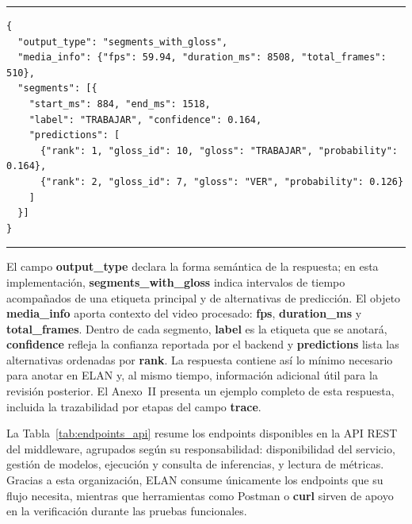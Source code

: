 \begin{center}
\begin{minipage}{0.92\textwidth}
\hrule
\vspace{0.12cm}
\footnotesize
\begin{Verbatim}[baselinestretch=0.76]
{
  "output_type": "segments_with_gloss",
  "media_info": {"fps": 59.94, "duration_ms": 8508, "total_frames": 510},
  "segments": [{
    "start_ms": 884, "end_ms": 1518,
    "label": "TRABAJAR", "confidence": 0.164,
    "predictions": [
      {"rank": 1, "gloss_id": 10, "gloss": "TRABAJAR", "probability": 0.164},
      {"rank": 2, "gloss_id": 7, "gloss": "VER", "probability": 0.126}
    ]
  }]
}
\end{Verbatim}
\vspace{0.05cm}
\hrule

\label{lst:respuesta_backend_middleware}
\end{minipage}
\end{center}

El campo \textbf{output\_type} declara la forma semántica de la respuesta; en esta implementación, \textbf{segments\_with\_gloss} indica intervalos de tiempo acompañados de una etiqueta principal y de alternativas de predicción. El objeto \textbf{media\_info} aporta contexto del video procesado: \textbf{fps}, \textbf{duration\_ms} y \textbf{total\_frames}. Dentro de cada segmento, \textbf{label} es la etiqueta que se anotará, \textbf{confidence} refleja la confianza reportada por el backend y \textbf{predictions} lista las alternativas ordenadas por \textbf{rank}. La respuesta contiene así lo mínimo necesario para anotar en ELAN y, al mismo tiempo, información adicional útil para la revisión posterior. El Anexo~II presenta un ejemplo completo de esta respuesta, incluida la trazabilidad por etapas del campo \textbf{trace}.

La Tabla~\ref{tab:endpoints_api} resume los endpoints disponibles en la API REST del middleware, agrupados según su responsabilidad: disponibilidad del servicio, gestión de modelos, ejecución y consulta de inferencias, y lectura de métricas. Gracias a esta organización, ELAN consume únicamente los endpoints que su flujo necesita, mientras que herramientas como Postman o \textbf{curl} sirven de apoyo en la verificación durante las pruebas funcionales.

